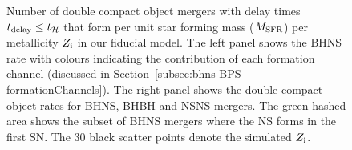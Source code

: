 \documentclass[twocolumn]{aastex63}
\newcommand\bhnsSingle{BHNS\xspace}
\newcommand{\Zi}{\ensuremath{Z_{\rm{i}}}\xspace}
\newcommand{\MSFR}{\ensuremath{{M}_{\rm{SFR}}}\xspace}
\newcommand{\tdelay}{\ensuremath{{t}_{\rm{delay}}}\xspace}
\newcommand{\tDCO}{\ensuremath{{t}_{\rm{DCO}}}\xspace}
\newcommand{\thubble}{\ensuremath{{t}_{\mathcal{H}}}\xspace}
\newcommand{\mbhf}{\ensuremath{m_{\rm{BH}}}\xspace}
\newcommand{\mtotf}{\ensuremath{m_{\rm{tot}}}\xspace}
\newcommand{\mchirpf}{\ensuremath{{\mathcal{M}}_{\rm{c}}}\xspace}
\newcommand{\qf}{\ensuremath{q_{\rm{f}}}\xspace}
\begin{document}
\begin{figure}
      \qquad
   \caption{Number of double compact object mergers with  delay times $\tdelay \leq \thubble$  that form per unit star forming mass  (\MSFR) per  metallicity $\Zi$ in our fiducial model.  The left panel shows the \bhnsSingle rate with colours indicating the contribution of each formation channel (discussed in Section~\ref{subsec:bhns-BPS-formationChannels}). The right panel shows the  double compact object rates for BHNS,  \ac{BHBH} and \ac{NSNS}  mergers. The green hashed area shows the subset of \bhnsSingle mergers where the \ac{NS} forms in the first SN.    The 30 black scatter points denote the simulated \Zi.}
  \label{fig:BHNS_rate_per_metallicity}
\end{figure}
%





%
%
%






\end{document}
